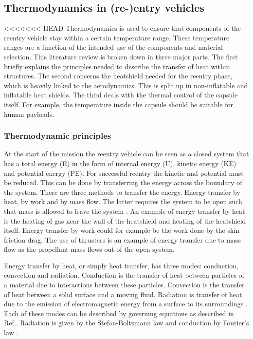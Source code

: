 \subsection{Thermodynamics in (re-)entry vehicles}\label{sec:thermo}
<<<<<<< HEAD
Thermodynamics is used to ensure that components of the reentry vehicle stay within a certain temperature range. These temperature ranges are a function of the intended use of the components and material selection. This literature review is broken down in three major parts. The first briefly explains the principles needed to describe the transfer of heat within structures. The second concerns the heatshield needed for the reentry phase, which is heavily linked to the aerodynamics. This is split up in non-inflatable and inflatable heat shields. The third deals with the thermal control of the capsule itself. For example, the temperature inside the capsule should be suitable for human payloads.

\subsubsection{Thermodynamic principles}
At the start of the mission the reentry vehicle can be seen as a closed system that has a total energy (E) in the form of internal energy (U), kinetic energy (KE) and potential energy (PE). For successful reentry the kinetic and potential must be reduced. This can be done by transferring the energy across the boundary of the system. There are three methods to transfer the energy. Energy transfer by heat, by work and by mass flow. The latter requires the system to be open such that mass is allowed to leave the system \cite{Cengel2010}. An example of energy transfer by heat is the heating of gas near the wall of the heatshield and heating of the heatshield itself. Energy transfer by work could for example be the work done by the skin friction drag. The use of thrusters is an example of energy transfer due to mass flow as the propellant mass flows out of the open system. 

Energy transfer by heat, or simply heat transfer, has three modes: conduction, convection and radiation. Conduction is the transfer of heat between particles of a material due to interactions between these particles. Convection is the transfer of heat between a solid surface and a moving fluid. Radiation is transfer of heat due to the emission of electromagnetic energy from a surface to its surroundings \cite{Cengel2010, Karam1998}. Each of these modes can be described by governing equations as described in Ref.\cite{Holman2002}. Radiation is given by the Stefan-Boltzmann law and conduction by Fourier's law \cite{Cengel2010, Holman2002}.

